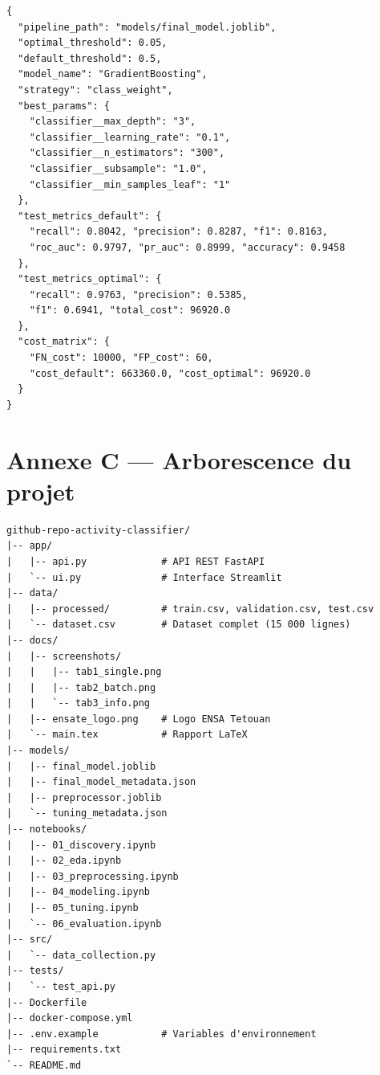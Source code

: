 \documentclass[12pt,a4paper]{article}
\begin{document}
\begin{lstlisting}[caption={Contenu de models/final\_model\_metadata.json}, label=lst:metadata, language={}]
{
  "pipeline_path": "models/final_model.joblib",
  "optimal_threshold": 0.05,
  "default_threshold": 0.5,
  "model_name": "GradientBoosting",
  "strategy": "class_weight",
  "best_params": {
    "classifier__max_depth": "3",
    "classifier__learning_rate": "0.1",
    "classifier__n_estimators": "300",
    "classifier__subsample": "1.0",
    "classifier__min_samples_leaf": "1"
  },
  "test_metrics_default": {
    "recall": 0.8042, "precision": 0.8287, "f1": 0.8163,
    "roc_auc": 0.9797, "pr_auc": 0.8999, "accuracy": 0.9458
  },
  "test_metrics_optimal": {
    "recall": 0.9763, "precision": 0.5385,
    "f1": 0.6941, "total_cost": 96920.0
  },
  "cost_matrix": {
    "FN_cost": 10000, "FP_cost": 60,
    "cost_default": 663360.0, "cost_optimal": 96920.0
  }
}
\end{lstlisting}

\section{Annexe C --- Arborescence du projet}

\begin{lstlisting}[language={}, caption={Structure du dépôt Git}]
github-repo-activity-classifier/
|-- app/
|   |-- api.py             # API REST FastAPI
|   `-- ui.py              # Interface Streamlit
|-- data/
|   |-- processed/         # train.csv, validation.csv, test.csv
|   `-- dataset.csv        # Dataset complet (15 000 lignes)
|-- docs/
|   |-- screenshots/
|   |   |-- tab1_single.png
|   |   |-- tab2_batch.png
|   |   `-- tab3_info.png
|   |-- ensate_logo.png    # Logo ENSA Tetouan
|   `-- main.tex           # Rapport LaTeX
|-- models/
|   |-- final_model.joblib
|   |-- final_model_metadata.json
|   |-- preprocessor.joblib
|   `-- tuning_metadata.json
|-- notebooks/
|   |-- 01_discovery.ipynb
|   |-- 02_eda.ipynb
|   |-- 03_preprocessing.ipynb
|   |-- 04_modeling.ipynb
|   |-- 05_tuning.ipynb
|   `-- 06_evaluation.ipynb
|-- src/
|   `-- data_collection.py
|-- tests/
|   `-- test_api.py
|-- Dockerfile
|-- docker-compose.yml
|-- .env.example           # Variables d'environnement
|-- requirements.txt
`-- README.md
\end{lstlisting}
\end{document}
